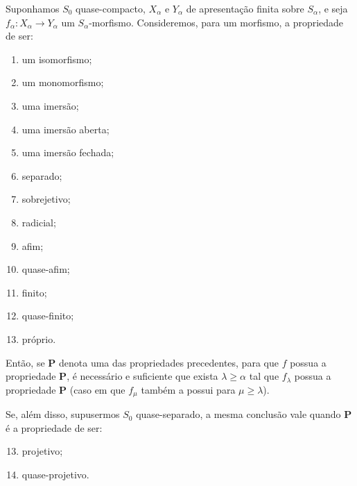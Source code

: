 \begin{theorem}[8.10.5]
\label{IV.8.10.5}
Suponhamos $S_0$ quase-compacto, $X_\alpha$ e $Y_\alpha$ de apresentação finita sobre $S_\alpha$, e seja $f_\alpha:X_\alpha\to Y_\alpha$ um $S_\alpha$-morfismo.
Consideremos, para um morfismo, a propriedade de ser:
\begin{enumerate}[label=(\roman*)]
\item um isomorfismo;
\item[\rm(i\,\emph{bis})] um monomorfismo;
\item uma imersão;
\item uma imersão aberta;
\item uma imersão fechada;
\item separado;
\item sobrejetivo;
\item radicial;
\item afim;
\item quase-afim;
\item finito;
\item quase-finito;
\item próprio.
\end{enumerate}
Então, se $\mathbf{P}$ denota uma das propriedades precedentes, para que $f$ possua a propriedade $\mathbf{P}$, é necessário e suficiente que exista $\lambda\geqslant\alpha$ tal que $f_\lambda$ possua a propriedade $\mathbf{P}$ (caso em que $f_\mu$ também a possui para $\mu\geqslant\lambda$).

Se, além disso, supusermos $S_0$ quase-separado, a mesma conclusão vale quando $\mathbf{P}$ é a propriedade de ser:
\begin{enumerate}[label=(\roman*)]
\setcounter{enumi}{12}
\item projetivo;
\item quase-projetivo.
\end{enumerate}
\end{theorem}

